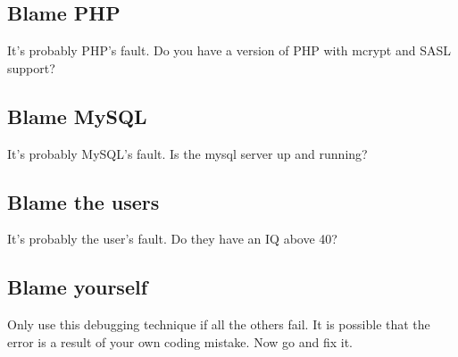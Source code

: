 \documentclass[11pt,letterpaper]{report}
\begin{document}
\subsection{Blame PHP}
It's probably PHP's fault.  Do you have a version of PHP with mcrypt and SASL
support?
\subsection{Blame MySQL}
It's probably MySQL's fault.  Is the mysql server up and running?
\subsection{Blame the users}
It's probably the user's fault.  Do they have an IQ above 40?
\subsection{Blame yourself}
Only use this debugging technique if all the others fail.
It is possible that the error is a result of your own coding mistake.
Now go and fix it.
\end{document}
